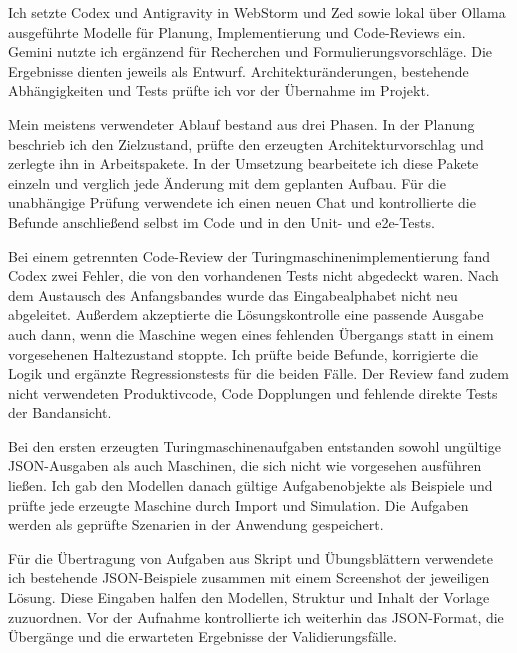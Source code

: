 

Ich setzte Codex und Antigravity in WebStorm und Zed sowie lokal über Ollama ausgeführte Modelle für Planung, Implementierung und Code-Reviews ein. Gemini nutzte ich ergänzend für Recherchen und Formulierungsvorschläge. Die Ergebnisse dienten jeweils als Entwurf. Architekturänderungen, bestehende Abhängigkeiten und Tests prüfte ich vor der Übernahme im Projekt.

Mein meistens verwendeter Ablauf bestand aus drei Phasen. In der Planung beschrieb ich den Zielzustand, prüfte den erzeugten Architekturvorschlag und zerlegte ihn in Arbeitspakete. In der Umsetzung bearbeitete ich diese Pakete einzeln und verglich jede Änderung mit dem geplanten Aufbau. Für die unabhängige Prüfung verwendete ich einen neuen Chat und kontrollierte die Befunde anschließend selbst im Code und in den Unit- und \gls{e2e}-Tests.

Bei einem getrennten Code-Review der Turingmaschinenimplementierung fand Codex zwei Fehler, die von den vorhandenen Tests nicht abgedeckt waren. Nach dem Austausch des Anfangsbandes wurde das Eingabealphabet nicht neu abgeleitet. Außerdem akzeptierte die Lösungskontrolle eine passende Ausgabe auch dann, wenn die Maschine wegen eines fehlenden Übergangs statt in einem vorgesehenen Haltezustand stoppte. Ich prüfte beide Befunde, korrigierte die Logik und ergänzte Regressionstests für die beiden Fälle. Der Review fand zudem nicht verwendeten Produktivcode, Code Dopplungen und fehlende direkte Tests der Bandansicht.


Bei den ersten erzeugten Turingmaschinenaufgaben entstanden sowohl ungültige JSON-Ausgaben als auch Maschinen, die sich nicht wie vorgesehen ausführen ließen. Ich gab den Modellen danach gültige Aufgabenobjekte als Beispiele und prüfte jede erzeugte Maschine durch Import und Simulation. Die Aufgaben werden als geprüfte Szenarien in der Anwendung gespeichert.

Für die Übertragung von Aufgaben aus Skript und Übungsblättern verwendete ich bestehende JSON-Beispiele zusammen mit einem Screenshot der jeweiligen Lösung. Diese Eingaben halfen den Modellen, Struktur und Inhalt der Vorlage zuzuordnen. Vor der Aufnahme kontrollierte ich weiterhin das JSON-Format, die Übergänge und die erwarteten Ergebnisse der Validierungsfälle.

